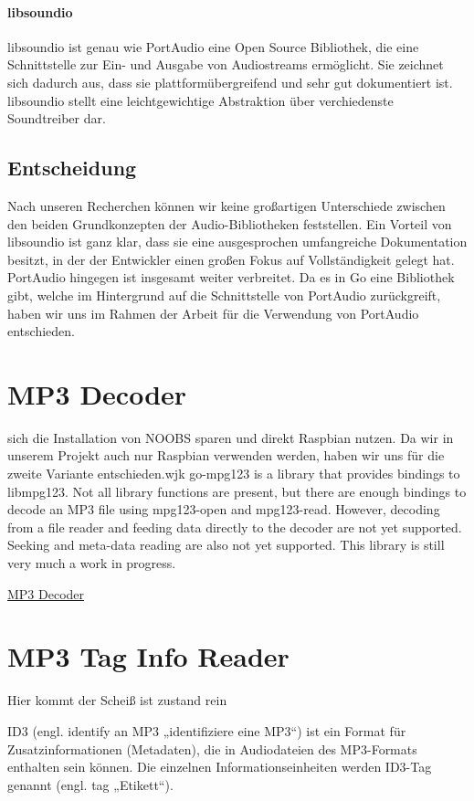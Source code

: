 \paragraph{libsoundio}
libsoundio ist genau wie PortAudio eine Open Source Bibliothek, die eine
Schnittstelle zur Ein- und Ausgabe von Audiostreams ermöglicht. Sie zeichnet
sich dadurch aus, dass sie plattformübergreifend und sehr gut dokumentiert ist.
libsoundio stellt eine leichtgewichtige Abstraktion über verchiedenste
Soundtreiber dar.

\subsection{Entscheidung}
Nach unseren Recherchen können wir keine großartigen Unterschiede zwischen den
beiden Grundkonzepten der Audio-Bibliotheken feststellen. Ein Vorteil von
libsoundio ist ganz klar, dass sie eine ausgesprochen umfangreiche
Dokumentation besitzt, in der der Entwickler einen großen Fokus auf
Vollständigkeit gelegt hat. PortAudio hingegen ist insgesamt weiter verbreitet.
Da es in Go eine Bibliothek gibt, welche im Hintergrund auf die Schnittstelle
von PortAudio zurückgreift, haben wir uns im Rahmen der Arbeit für die
Verwendung von PortAudio entschieden.

\section{MP3 Decoder}
sich die Installation von \ac{NOOBS} sparen und direkt Raspbian nutzen. Da wir in unserem Projekt auch nur Raspbian verwenden werden, haben wir uns für die zweite Variante entschieden.wjk
go-mpg123 is a library that provides bindings to libmpg123.
Not all library functions are present, but there are enough bindings to decode an MP3 file using mpg123-open and mpg123-read. However, decoding from a file reader and feeding data directly to the decoder are not yet supported. Seeking and meta-data reading are also not yet supported.
This library is still very much a work in progress.

\href{https://github.com/bobertlo/go-mpg123}{MP3 Decoder}

\section{MP3 Tag Info Reader}
Hier kommt der Scheiß ist zustand rein

ID3 (engl. identify an MP3 „identifiziere eine MP3“) ist ein Format für Zusatzinformationen (Metadaten), die in Audiodateien des MP3-Formats enthalten sein können. Die einzelnen Informationseinheiten werden ID3-Tag genannt (engl. tag „Etikett“).

